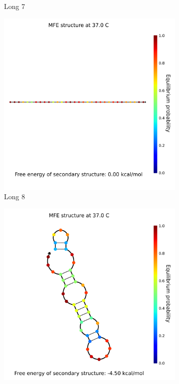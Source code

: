 \begin{figure}[h]
\begin{subfigure}{.32\columnwidth}
  \caption{Long 7}
\end{subfigure}
\begin{subfigure}{.32\columnwidth}
  \centering
  \includegraphics[width=\linewidth]{images/long_rna_secondarystructure_8.png}
  \caption{Long 8}
\end{subfigure}
\begin{subfigure}{.32\columnwidth}
  \centering
  \includegraphics[width=\linewidth]{images/long_rna_secondarystructure_9.png}

\end{subfigure}
\end{figure}
